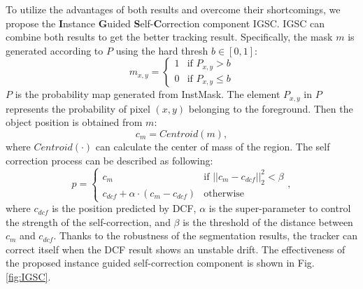 \documentclass[review]{elsarticle}
\begin{document}
To utilize the advantages of both results and overcome their shortcomings, we propose the \textbf{I}nstance \textbf{G}uided \textbf{S}elf-\textbf{C}orrection component IGSC. IGSC can combine both results to get the better tracking result. Specifically, the mask $m$ is generated according to $P$ using the hard thresh $b \in [0, 1] $:
\begin{equation}
m_{x,y} = \left\{ \begin{array}{ll}
 1 & \textrm{if $P_{x,y} > b$}\\
 0 & \textrm{if $P_{x,y} \le b$}
 \end{array} \right.
\end{equation}
$P$ is the probability map generated from InstMask. The element $P_{x,y}$ in $P$ represents the probability of pixel $(x,y)$ belonging to the foreground.
Then the object position is obtained from $m$:
\begin{equation}
c_{m} = Centroid(m),
\end{equation}
where $Centroid(\mathord{\cdot})$ can calculate the center of mass of the region. The self correction process can be described as following:
\begin{equation}
p = \left\{ \begin{array}{ll}
 c_{m} & \textrm{if $||c_{m}-c_{dcf}||_2^2 < \beta$}\\
 c_{dcf} + \alpha \cdot (c_{m}-c_{dcf}) & \textrm{otherwise}
 \end{array} \right.,
\end{equation}
where $c_{dcf}$ is the position predicted by DCF, $\alpha$ is the super-parameter to control the strength of the self-correction, and  $\beta$ is the threshold of the distance between $c_{m}$ and $c_{dcf}$.
Thanks to the robustness of the segmentation results, the tracker can correct itself when the DCF result shows an unstable drift. The effectiveness of the proposed instance guided self-correction component is shown in Fig. \ref{fig:IGSC}.
\end{document}

